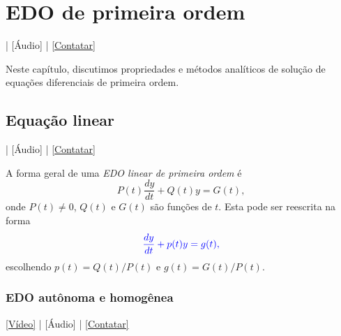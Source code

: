 
\chapter{EDO de primeira ordem}\label{cap_edo1ordem}
\thispagestyle{fancy}

\begin{flushright}
  [Vídeo] | [Áudio] | \href{https://phkonzen.github.io/notas/contato.html}{[Contatar]}
\end{flushright}

Neste capítulo, discutimos propriedades e métodos analíticos de solução de equações diferenciais de primeira ordem.

\section{Equação linear}\label{cap_edo1ordem_sec_eqlinear}

\begin{flushright}
  [Vídeo] | [Áudio] | \href{https://phkonzen.github.io/notas/contato.html}{[Contatar]}
\end{flushright}

A forma geral de uma \emph{EDO linear de primeira ordem} é
\begin{equation}
  P(t)\frac{dy}{dt} + Q(t)y = G(t),
\end{equation}
onde $P(t) \neq 0$, $Q(t)$ e $G(t)$ são funções de $t$. Esta pode ser reescrita na forma
\begin{equation}
  \color{blue}{\frac{dy}{dt} + p(t)y = g(t)},
\end{equation}
escolhendo $p(t) = Q(t)/P(t)$ e $g(t) = G(t)/P(t)$.

\subsection{EDO autônoma e homogênea}

\begin{flushright}  \href{https://archive.org/details/metodo-de-solucao-edo-ordem-1-linear-coeficientes-constantes-homogenea_20200421}{[Vídeo]} | [Áudio] | \href{https://phkonzen.github.io/notas/contato.html}{[Contatar]}
\end{flushright}

